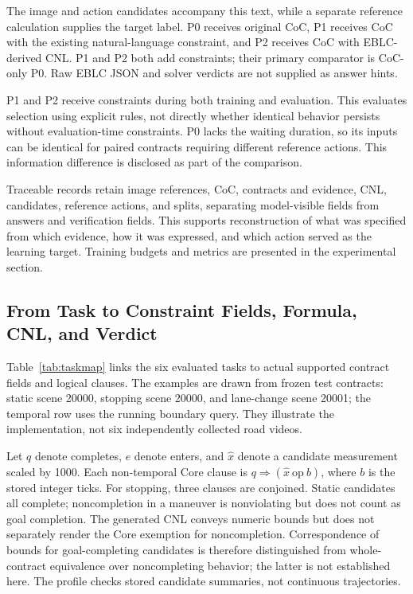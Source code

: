 \documentclass[nolineno]{ieeeaccess}
\begin{document}
The image and action candidates accompany this text, while a separate reference calculation supplies the target label. P0 receives original CoC, P1 receives CoC with the existing natural-language constraint, and P2 receives CoC with EBLC-derived CNL. P1 and P2 both add constraints; their primary comparator is CoC-only P0. Raw EBLC JSON and solver verdicts are not supplied as answer hints.\par

P1 and P2 receive constraints during both training and evaluation. This evaluates selection using explicit rules, not directly whether identical behavior persists without evaluation-time constraints. P0 lacks the waiting duration, so its inputs can be identical for paired contracts requiring different reference actions. This information difference is disclosed as part of the comparison.\par

Traceable records retain image references, CoC, contracts and evidence, CNL, candidates, reference actions, and splits, separating model-visible fields from answers and verification fields. This supports reconstruction of what was specified from which evidence, how it was expressed, and which action served as the learning target. Training budgets and metrics are presented in the experimental section.\par

\subsection{From Task to Constraint Fields, Formula, CNL, and Verdict}

Table~\ref{tab:taskmap} links the six evaluated tasks to actual supported contract fields and logical clauses. The examples are drawn from frozen test contracts: static scene 20000, stopping scene 20000, and lane-change scene 20001; the temporal row uses the running boundary query. They illustrate the implementation, not six independently collected road videos.\par

Let $q$ denote {\ttfamily{}\selectfont\footnotesize completes}, $e$ denote {\ttfamily{}\selectfont\footnotesize enters}, and $\widehat{x}$ denote a candidate measurement scaled by 1000. Each non-temporal Core clause is $q\Rightarrow(\widehat{x}\ \mathrm{op}\ b)$, where $b$ is the stored integer {\ttfamily{}\selectfont\footnotesize ticks}. For stopping, three clauses are conjoined. Static candidates all complete; noncompletion in a maneuver is nonviolating but does not count as goal completion. The generated CNL conveys numeric bounds but does not separately render the Core exemption for noncompletion. Correspondence of bounds for goal-completing candidates is therefore distinguished from whole-contract equivalence over noncompleting behavior; the latter is not established here. The profile checks stored candidate summaries, not continuous trajectories.\par
\end{document}

